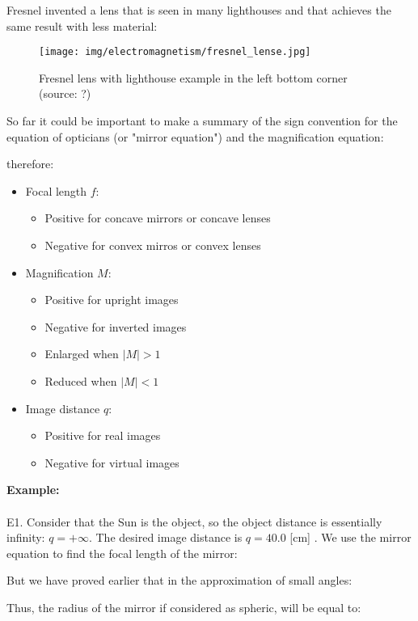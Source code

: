 	Fresnel invented a lens that is seen in many lighthouses and that achieves the same result with less material:	
	\begin{figure}[H]
		\centering
		\texttt{[image: img/electromagnetism/fresnel\_lense.jpg]}
		\caption[Fresnel lens with lighthouse example in the left bottom corner]{Fresnel lens with lighthouse example in the left bottom corner (source: ?)}
	\end{figure}
	\pagebreak
	So far it could be important to make a summary of the sign convention for the equation of opticians (or "mirror equation") and the magnification equation:
	
	therefore:
	\begin{itemize}
		\item Focal length $f$:
			\begin{itemize}
				\item Positive for concave mirrors or concave lenses
				\item Negative for convex mirros or convex lenses
			\end{itemize}
		\item Magnification $M$:
			\begin{itemize}
				\item Positive for upright images
				\item Negative for inverted images
				\item Enlarged when $|M|>1$
				\item Reduced when $|M|<1$
			\end{itemize}
		\item Image distance $q$:
			\begin{itemize}
				\item Positive for real images
				\item Negative for virtual images
			\end{itemize}
	\end{itemize}
	
	\begin{tcolorbox}[colframe=black,colback=white,sharp corners]
	\textbf{{\Large {}}Example:}\\\\
	E1. Consider that the Sun is the object, so the object distance is essentially infinity: $q=+\infty$. The desired image distance
is $q=40.0$ [cm] . We use the mirror equation to find the focal length of the mirror:
	
	But we have proved earlier that in the approximation of small angles:
	
	Thus, the radius of the mirror if considered as spheric, will be equal to:
	
	\end{tcolorbox}
	
